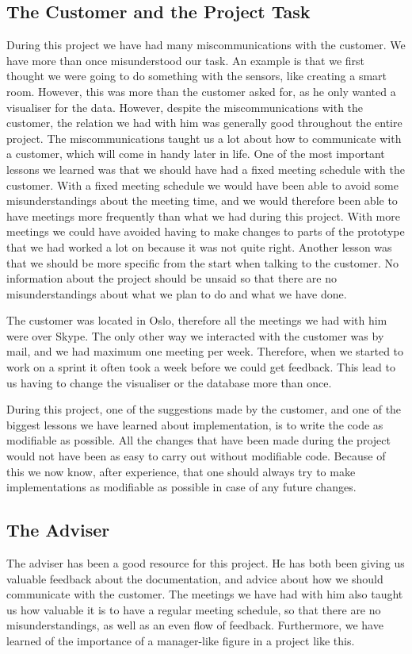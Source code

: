 \documentclass[../document]{subfiles}
\begin{document}
\subsection{The Customer and the Project Task}
During this project we have had many miscommunications with the customer. We have more than once misunderstood our task. An example is that we first thought we were going to do something with the sensors, like creating a smart room. However, this was more than the customer asked for, as he only wanted a visualiser for the data. However, despite the  miscommunications with the customer, the relation we had with him was generally good throughout the entire project. The miscommunications taught us a lot about how to communicate with a customer, which will come in handy later in life. One of the most important lessons we learned was that we should have had a fixed meeting schedule with the customer. With a fixed meeting schedule we would have been able to avoid some misunderstandings about the meeting time, and we would therefore been able to have meetings more frequently than what we had during this project. With more meetings we could have avoided having to make changes to parts of the prototype that we had worked a lot on because it was not quite right. Another lesson was that we should be more specific from the start when talking to the customer. No information about the project should be unsaid so that there are no misunderstandings about what we plan to do and what we have done.   

The customer was located in Oslo, therefore all the meetings we had with him were over Skype. The only other way we interacted with the customer was by mail, and we had maximum one meeting per week. Therefore, when we started to work on a sprint it often took a week before we could get feedback. This lead to us having to change the visualiser or the database more than once. 

During this project, one of the suggestions made by the customer, and one of the biggest lessons we have learned about implementation, is to write the code as modifiable as possible. All the changes that have been made during the project would not have been as easy to carry out without modifiable code. Because of this we now know, after experience, that one should always try to make implementations as modifiable as possible in case of any future changes. 

\subsection{The Adviser}
The adviser has been a good resource for this project. He has both been giving us valuable feedback about the documentation, and advice about how we should communicate with the customer. The meetings we have had with him also taught us how valuable it is to have a regular meeting schedule, so that there are no misunderstandings, as well as an even flow of feedback. Furthermore, we have learned of the importance of a manager-like figure in a project like this.
\end{document}
